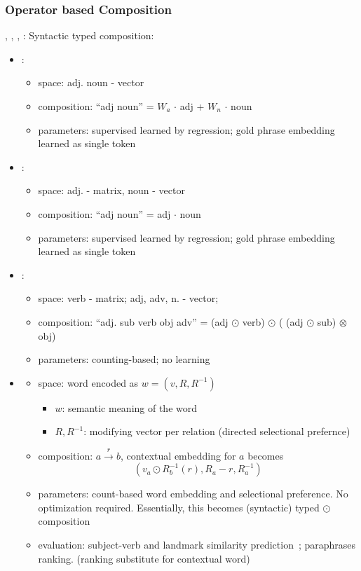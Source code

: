 \documentclass{article} %
\begin{document}
\subsubsection{Operator based Composition}
\cite{guevara2010regression}, \cite{baroni2010nouns}, \cite{grefenstette2011experimental},
\cite{erk2008structured}:
Syntactic typed composition:
\begin{itemize}
\item \cite{guevara2010regression}:
	\begin{itemize}
	\item space: adj. noun - vector
	\item composition:
	``adj noun'' = $W_a$ $\cdot$ adj + $W_n$ $\cdot$ noun
	\item parameters: supervised learned by regression;
		gold phrase embedding learned as single token
	\end{itemize}
\item \cite{baroni2010nouns}:
	\begin{itemize}
	\item space: adj. - matrix, noun - vector
	\item composition: ``adj noun'' = adj $\cdot$ noun
	\item parameters: supervised learned by regression;
		gold phrase 	embedding learned as single token
	\end{itemize}
\item \cite{grefenstette2011experimental}:
	\begin{itemize}
	\item space: verb - matrix; adj, adv, n. - vector;
	\item composition: ``adj. sub verb obj adv'' =
	(adj $\odot$ verb)
	$\odot$ ( (adj $\odot$ sub) $\otimes$ obj)
	\item parameters: counting-based; no learning
	\end{itemize}
\item \cite{erk2008structured}
	\begin{itemize}
	\item space: word encoded as $w = (v, R, R^{-1})$
		\begin{itemize}
		\item $w$: semantic meaning of the word
		\item $R, R^{-1}$: modifying vector per relation
			(directed selectional prefernce)
		\end{itemize}
	\item composition: $a \stackrel{r}{\rightarrow} b$,
		contextual embedding for $a$ becomes
		\begin{equation}
		(v_a \odot R_b^{-1}(r), R_a - {r}, R_a^{-1})
		\end{equation}
	\item parameters: count-based word embedding and
		selectional preference. No optimization required.
		Essentially, this becomes (syntactic) typed $\odot$
		composition
	\item evaluation: subject-verb and landmark similarity
		prediction~\cite{mitchell2008vector}; paraphrases
		ranking. (ranking substitute for contextual word)
	\end{itemize}
\end{itemize}
\end{document}
